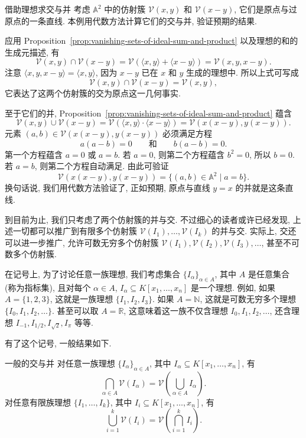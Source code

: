 \begin{Example}{借助理想求交与并}\leavevmode\label{ex:intersection-and-union-via-ideals}
  考虑 $\mathbb{A}^{2}$ 中的仿射簇 $\mathcal{V}(x,y)$ 和 $\mathcal{V}(x-y)$, 它们是原点与过原点的一条直线. 本例用代数方法计算它们的交与并, 验证预期的结果.

  应用 Proposition~\ref{prop:vanishing-sets-of-ideal-sum-and-product} 以及理想的和的生成元描述, 有
  \[
    \mathcal{V}(x,y)\cap\mathcal{V}(x-y)
      =\mathcal{V}(\langle x,y\rangle+\langle x-y\rangle)=\mathcal{V}(x,y,x-y).
  \]
  注意 $\langle x,y,x-y\rangle=\langle x,y\rangle$, 因为 $x-y$ 已在 $x$ 和 $y$ 生成的理想中. 所以上式可写成
  \[
    \mathcal{V}(x,y)\cap\mathcal{V}(x-y)=\mathcal{V}(x,y),
  \]
  它表达了这两个仿射簇的交为原点这一几何事实.

  至于它们的并, Proposition~\ref{prop:vanishing-sets-of-ideal-sum-and-product} 蕴含
  \[
    \mathcal{V}(x,y)\cup\mathcal{V}(x-y)
      =\mathcal{V}(\langle x,y\rangle\cdot\langle x-y\rangle)
      =\mathcal{V}(x(x-y),y(x-y)).
  \]
  元素 $(a,b)\in\mathcal{V}(x(x-y),y(x-y))$ 必须满足方程
  \[
    a(a-b)=0 \qquad\text{和}\qquad b(a-b)=0.
  \]
  第一个方程蕴含 $a=0$ 或 $a=b$. 若 $a=0$, 则第二个方程蕴含 $b^{2}=0$, 所以 $b=0$. 若 $a=b$, 则第二个方程自动满足. 由此可验证
  \[
    \mathcal{V}(x(x-y),y(x-y))=\{(a,b)\in\mathbb{A}^{2}\mid a=b\}.
  \]
  换句话说, 我们用代数方法验证了, 正如预期, 原点与直线 $y=x$ 的并就是这条直线.
\end{Example}

到目前为止, 我们只考虑了两个仿射簇的并与交. 不过细心的读者或许已经发现, 上述一切都可以推广到有限多个仿射簇 $\mathcal{V}(I_{1}),\ldots,\mathcal{V}(I_{k})$ 的并与交. 实际上, 交还可以进一步推广, 允许可数无穷多个仿射簇 $\mathcal{V}(I_{1}),\mathcal{V}(I_{2}),\mathcal{V}(I_{3}),\ldots$, 甚至不可数多个仿射簇.

在记号上, 为了讨论任意一族理想, 我们考虑集合 $\{I_{\alpha}\}_{\alpha\in A}$, 其中 $A$ 是任意集合 (称为指标集), 且对每个 $\alpha\in A$, $I_{\alpha}\subseteq K[x_{1},\ldots,x_{n}]$ 是一个理想. 例如, 如果 $A=\{1,2,3\}$, 这就是一族理想 $\{I_{1},I_{2},I_{3}\}$. 如果 $A=\mathbb{N}$, 这就是可数无穷多个理想 $\{I_{0},I_{1},I_{2},\ldots\}$. 甚至可以取 $A=\mathbb{R}$, 这意味着这一族不仅含理想 $I_{0},I_{1},I_{2},\ldots$, 还含理想 $I_{-1},I_{1/2},I_{\sqrt{2}},I_{\pi}$ 等等.

有了这个记号, 一般结果如下.

\begin{Proposition}{一般的交与并}\leavevmode\label{prop:arbitrary-intersections-and-finite-unions}
  对任意一族理想 $\{I_{\alpha}\}_{\alpha\in A}$, 其中 $I_{\alpha}\subseteq K[x_{1},\ldots,x_{n}]$, 有
  \[
    \bigcap_{\alpha\in A}\mathcal{V}(I_{\alpha})
      =\mathcal{V}\left(\bigcup_{\alpha\in A}I_{\alpha}\right).
  \]
  对任意有限族理想 $\{I_{1},\ldots,I_{k}\}$, 其中 $I_{i}\subseteq K[x_{1},\ldots,x_{n}]$, 有
  \[
    \bigcup_{i=1}^{k}\mathcal{V}(I_{i})
      =\mathcal{V}\left(\bigcap_{i=1}^{k}I_{i}\right).
  \]
\end{Proposition}


